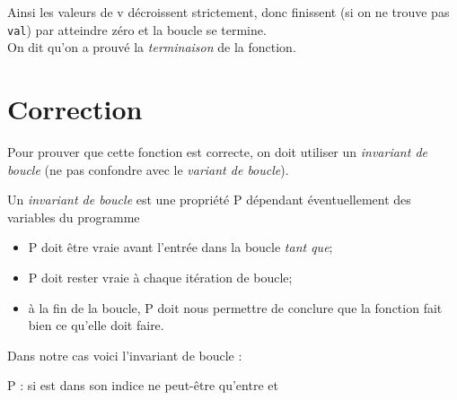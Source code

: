 Ainsi les valeurs de v décroissent strictement, donc finissent (si on ne trouve pas \texttt{val}) par atteindre zéro et la boucle se termine.\\
On dit qu'on a prouvé la \textit{terminaison} de la fonction.

\section{Correction}

Pour prouver que cette fonction est correcte, on doit utiliser un \textit{invariant de boucle} (ne pas confondre avec le \textit{variant de boucle}).

\begin{definition}[]
Un \textit{invariant de boucle} est une propriété P dépendant éventuellement des variables du programme
\begin{itemize}
    \item   P doit être vraie avant l'entrée dans la boucle \textit{tant que};
    \item   P doit rester vraie à chaque itération de boucle;
    \item   à la fin de la boucle, P doit nous permettre de conclure que la fonction \og fait bien ce qu'elle doit faire\fg{}.
\end{itemize}
\end{definition}


Dans notre cas voici l'invariant de boucle :
\begin{center}
P : \og si  est dans  son indice ne peut-être qu'entre  et \fg{}
\end{center}

